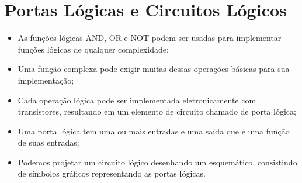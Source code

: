 
\section{Portas Lógicas e Circuitos Lógicos}

\begin{frame}{\insertsection} 
	\begin{itemize}
		\item As funções lógicas AND, OR e NOT podem ser usadas para implementar funções lógicas de qualquer complexidade;
		\pause
		\item Uma função complexa pode exigir muitas dessas operações básicas para sua implementação;
		\pause
		\item Cada operação lógica pode ser implementada eletronicamente com transistores, resultando em um elemento de circuito chamado de porta lógica;
		\pause
		\item Uma porta lógica tem uma ou mais entradas e uma saída que é uma função de suas entradas;
		\pause
		\item Podemos projetar um circuito lógico desenhando um esquemático, consistindo de símbolos gráficos representando as portas lógicas.
    \end{itemize}
\end{frame}

